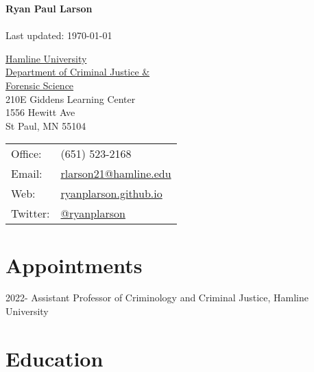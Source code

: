 \documentclass[letterpaper]{article}
\def\name{Ryan Paul Larson}
\renewenvironment{itemize}{
  \begin{list}{}{
    \setlength{\leftmargin}{1.5em}
  }
}{
  \end{list}
}
\begin{document}
\textbf{{\huge \name}}\\
\\
Last updated: \today

\vspace{5ex}





\begin{minipage}{0.45\linewidth}
  \href{https://www.hamline.edu/}{Hamline University} \\
   \href{https://www.hamline.edu/academics/undergraduate/criminology}{Department of Criminal Justice \& \\  Forensic Science} \\
  210E Giddens Learning Center \\
 1556 Hewitt Ave \\
 St Paul, MN 55104
\end{minipage}
\begin{minipage}{0.45\linewidth}
  \begin{tabular}{ll}
    Office: & (651) 523-2168 \\
    Email: & \href{mailto:rlarson21@hamline.edu}{rlarson21@hamline.edu} \\
    Web: & \href{https://ryanplarson.github.io/personal_site/}{ryanplarson.github.io} \\
   Twitter: &  \href{https://twitter.com/ryanplarson}{@ryanplarson} \\
  \end{tabular}
\end{minipage}



\section*{\textbf{Appointments}}


\begin{itemize}

\item 2022-    Assistant Professor of Criminology and Criminal Justice, Hamline University

\end{itemize}



\section*{\textbf{Education}}
\end{document}
